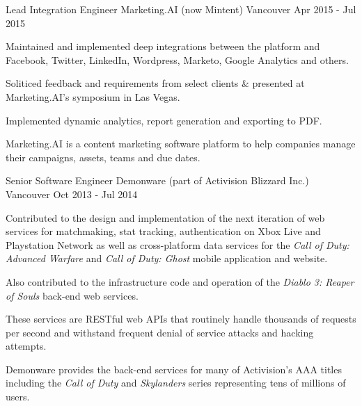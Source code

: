 \begin{cventries}
  \cventrywithsummary
    {Lead Integration Engineer} %
    {Marketing.AI (now Mintent)} %
    {Vancouver} %
    {Apr 2015 - Jul 2015} %
    {
      \begin{cvitems} %
        \item {Maintained and implemented deep integrations between the platform and Facebook, Twitter, LinkedIn, Wordpress, Marketo, Google Analytics and others.}
        \item {Soliticed feedback and requirements from select clients \& presented at Marketing.AI's symposium in Las Vegas.}
        \item {Implemented dynamic analytics, report generation and exporting to PDF.}
      \end{cvitems}
    }
    {
      Marketing.AI is a content marketing software platform to help companies manage their campaigns, assets, teams and due dates.
    }

  \cventrywithsummary
    {Senior Software Engineer} %
    {Demonware (part of Activision Blizzard Inc.)} %
    {Vancouver} %
    {Oct 2013 - Jul 2014} %
    {
      \begin{cvitems} %
        \item {Contributed to the design and implementation of the next iteration of web services for matchmaking, stat tracking, authentication on Xbox Live and Playstation Network as well as cross-platform data services for the \textit{Call of Duty: Advanced Warfare} and \textit{Call of Duty: Ghost} mobile application and website.}
        \item {Also contributed to the infrastructure code and operation of the \textit{Diablo 3: Reaper of Souls} back-end web services.}
        \item {These services are RESTful web APIs that routinely handle thousands of requests per second and withstand frequent denial of service attacks and hacking attempts.}
      \end{cvitems}
    }
    {
      Demonware provides the back-end services for many of Activision's AAA titles including the \textit{Call of Duty} and \textit{Skylanders} series representing tens of millions of users.
    }


\end{cventries}
